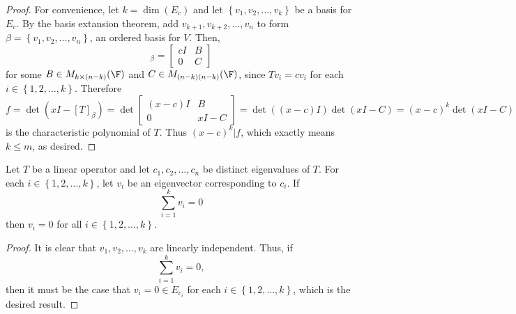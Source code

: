 \documentclass[linearalgebraI]{subfiles}
\begin{document}
    \begin{proof}
        For convenience, let $k = \dim \left( E_c \right)$ and let $\left\lbrace v_1, v_2, \ldots, v_k \right\rbrace$ be a basis for $E_c$. By the basis extansion theorem, add $v_{k+1}, v_{k+2}, \ldots, v_n$ to form $\beta = \left\lbrace v_1, v_2, \ldots, v_n \right\rbrace$, an ordered basis for $V$. Then,
        \begin{equation*}
            [T]_\beta =
            \begin{bmatrix}
                cI & B \\ 0 & C
            \end{bmatrix}
        \end{equation*}
        for some $B\in M_{k\times (n-k)}(\F)$ and $C\in M_{(n-k)(n-k)}(\F)$, since $Tv_i = c v_i$ for each $i\in \left\lbrace 1, 2, \ldots, k \right\rbrace$. Therefore
        \begin{equation*}
            f = \det \left( xI-\left[ T \right] _\beta \right) = \det \begin{bmatrix} (x-c)I & B \\ 0 & xI-C \end{bmatrix} = \det \left( (x-c)I \right)\det \left( xI-C \right) = (x-c)^k \det \left( xI-C \right)
        \end{equation*}
        is the characteristic polynomial of $T$. Thus $(x-c)^k|f$, which exactly means $k\leq m$, as desired.
    \end{proof}

    \begin{prop}{}
        Let $T$ be a linear operator and let $c_1, c_2, \ldots, c_n$ be distinct eigenvalues of $T$. For each $i\in \left\lbrace 1, 2, \ldots, k \right\rbrace$, let $v_i$ be an eigenvector corresponding to $c_i$. If
        \begin{equation*}
            \sum^k_{i=1} v_i = 0
        \end{equation*}
        then $v_i=0$ for all $i\in \left\lbrace 1, 2, \ldots, k \right\rbrace$.
    \end{prop}

    \begin{proof}
        It is clear that $v_1, v_2, \ldots, v_k$ are linearly independent. Thus, if
        \begin{equation*}
            \sum^k_{i=1}v_i = 0,
        \end{equation*}
        then it must be the case that $v_i = 0\in E_{c_i}$ for each $i\in \left\lbrace 1, 2, \ldots, k \right\rbrace$, which is the desired result.
    \end{proof}
\end{document}
